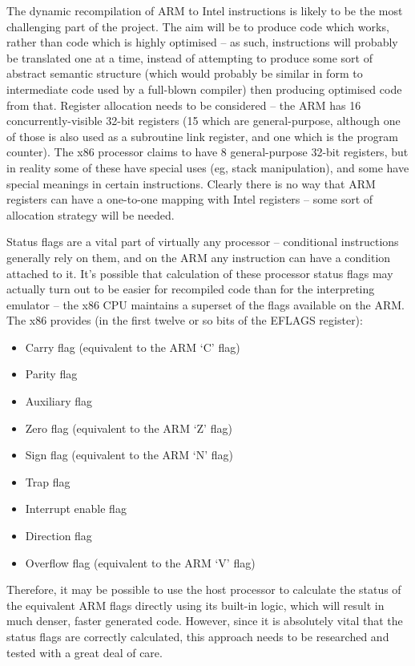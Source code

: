 The dynamic recompilation of ARM to Intel instructions is likely to be the most challenging part of the project. The aim will be to produce code which works, rather than code which is highly optimised -- as such, instructions will probably be translated one at a time, instead of attempting to produce some sort of abstract semantic structure (which would probably be similar in form to intermediate code used by a full-blown compiler) then producing optimised code from that. Register allocation needs to be considered -- the ARM has 16 concurrently-visible 32-bit registers (15 which are general-purpose, although one of those is also used as a subroutine link register, and one which is the program counter). The x86 processor claims to have 8 general-purpose 32-bit registers, but in reality some of these have special uses (eg, stack manipulation), and some have special meanings in certain instructions. Clearly there is no way that ARM registers can have a one-to-one mapping with Intel registers -- some sort of allocation strategy will be needed.

Status flags are a vital part of virtually any processor -- conditional instructions generally rely on them, and on the ARM any instruction can have a condition attached to it. It's possible that calculation of these processor status flags may actually turn out to be easier for recompiled code than for the interpreting emulator -- the x86 CPU maintains a superset of the flags available on the ARM. The x86 provides (in the first twelve or so bits of the EFLAGS register):

\begin{itemize}

\item Carry flag (equivalent to the ARM `C' flag)
\item Parity flag
\item Auxiliary flag
\item Zero flag (equivalent to the ARM `Z' flag)
\item Sign flag (equivalent to the ARM `N' flag)
\item Trap flag
\item Interrupt enable flag
\item Direction flag
\item Overflow flag (equivalent to the ARM `V' flag)

\end{itemize}

Therefore, it may be possible to use the host processor to calculate the status of the equivalent ARM flags directly using its built-in logic, which will result in much denser, faster generated code. However, since it is absolutely vital that the status flags are correctly calculated, this approach needs to be researched and tested with a great deal of care.

